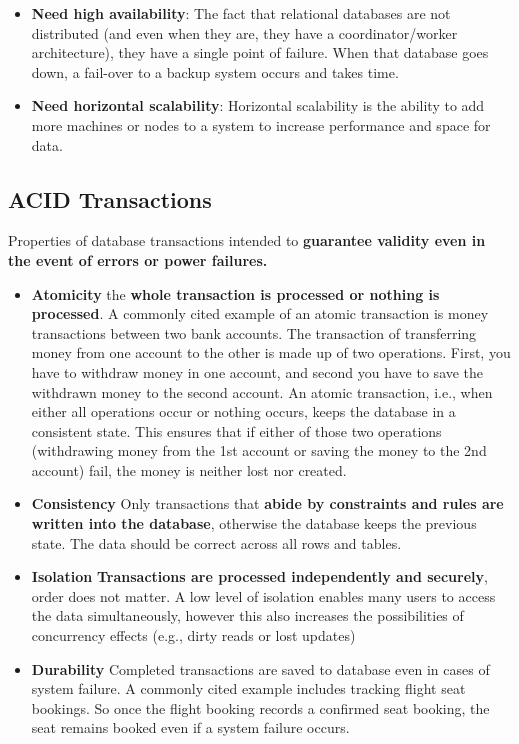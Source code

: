\documentclass[
	paper=a4,%
	pagesize,%
	8pt, fleqn,%
	headings=small,%
	notitlepage,%
	parskip=never]%
	{scrreprt}
\begin{document}
\begin{multicols*}{3}
\begin{itemize}
\item \textbf{Need high availability}: The fact that relational databases are not distributed (and even when they are, they have a coordinator/worker architecture), they have a single point of failure. When that database goes down, a fail-over to a backup system occurs and takes time.

\item \textbf{Need horizontal scalability}: Horizontal scalability is the ability to add more machines or nodes to a system to increase performance and space for data.
\end{itemize}

\subsection{ACID Transactions}
Properties of database transactions intended to \textbf{guarantee validity even in the event of errors or power failures.}

\begin{itemize}
\item \textbf{Atomicity} the \textbf{whole transaction is processed or nothing is processed}. A commonly cited example of an atomic transaction is money transactions between two bank accounts. The transaction of transferring money from one account to the other is made up of two operations. First, you have to withdraw money in one account, and second you have to save the withdrawn money to the second account. An atomic transaction, i.e., when either all operations occur or nothing occurs, keeps the database in a consistent state. This ensures that if either of those two operations (withdrawing money from the 1st account or saving the money to the 2nd account) fail, the money is neither lost nor created. 

\item \textbf{Consistency} Only transactions that \textbf{abide by constraints and rules are written into the database}, otherwise the database keeps the previous state. The data should be correct across all rows and tables.

\item \textbf{Isolation} \textbf{Transactions are processed independently and securely}, order does not matter. A low level of isolation enables many users to access the data simultaneously, however this also increases the possibilities of concurrency effects (e.g., dirty reads or lost updates)

\item \textbf{Durability} Completed transactions are saved to database even in cases of system failure. A commonly cited example includes tracking flight seat bookings. So once the flight booking records a confirmed seat booking, the seat remains booked even if a system failure occurs.
\end{itemize}



\end{multicols*}
\end{document}
